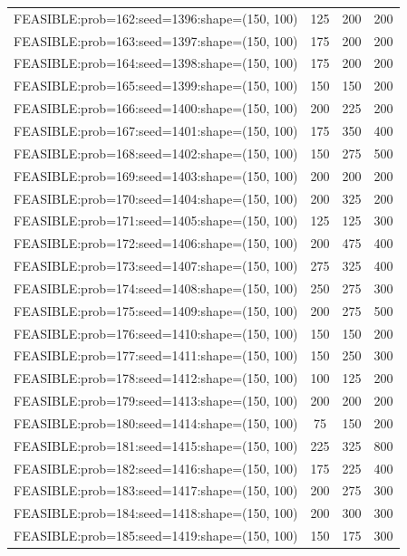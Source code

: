 \begin{longtable}{lccc}
FEASIBLE:prob=162:seed=1396:shape=(150, 100) &  125 &   200 &    200 \\
FEASIBLE:prob=163:seed=1397:shape=(150, 100) &  175 &   200 &    200 \\
FEASIBLE:prob=164:seed=1398:shape=(150, 100) &  175 &   200 &    200 \\
FEASIBLE:prob=165:seed=1399:shape=(150, 100) &  150 &   150 &    200 \\
FEASIBLE:prob=166:seed=1400:shape=(150, 100) &  200 &   225 &    200 \\
FEASIBLE:prob=167:seed=1401:shape=(150, 100) &  175 &   350 &    400 \\
FEASIBLE:prob=168:seed=1402:shape=(150, 100) &  150 &   275 &    500 \\
FEASIBLE:prob=169:seed=1403:shape=(150, 100) &  200 &   200 &    200 \\
FEASIBLE:prob=170:seed=1404:shape=(150, 100) &  200 &   325 &    200 \\
FEASIBLE:prob=171:seed=1405:shape=(150, 100) &  125 &   125 &    300 \\
FEASIBLE:prob=172:seed=1406:shape=(150, 100) &  200 &   475 &    400 \\
FEASIBLE:prob=173:seed=1407:shape=(150, 100) &  275 &   325 &    400 \\
FEASIBLE:prob=174:seed=1408:shape=(150, 100) &  250 &   275 &    300 \\
FEASIBLE:prob=175:seed=1409:shape=(150, 100) &  200 &   275 &    500 \\
FEASIBLE:prob=176:seed=1410:shape=(150, 100) &  150 &   150 &    200 \\
FEASIBLE:prob=177:seed=1411:shape=(150, 100) &  150 &   250 &    300 \\
FEASIBLE:prob=178:seed=1412:shape=(150, 100) &  100 &   125 &    200 \\
FEASIBLE:prob=179:seed=1413:shape=(150, 100) &  200 &   200 &    200 \\
FEASIBLE:prob=180:seed=1414:shape=(150, 100) &   75 &   150 &    200 \\
FEASIBLE:prob=181:seed=1415:shape=(150, 100) &  225 &   325 &    800 \\
FEASIBLE:prob=182:seed=1416:shape=(150, 100) &  175 &   225 &    400 \\
FEASIBLE:prob=183:seed=1417:shape=(150, 100) &  200 &   275 &    300 \\
FEASIBLE:prob=184:seed=1418:shape=(150, 100) &  200 &   300 &    300 \\
FEASIBLE:prob=185:seed=1419:shape=(150, 100) &  150 &   175 &    300 \\

\end{longtable}
